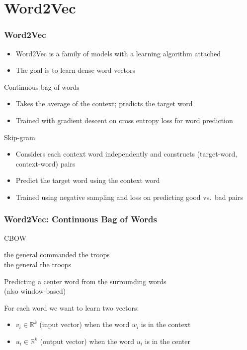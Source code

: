 \section{Word2Vec}
\frame{\tableofcontents[currentsection]}

\begin{frame}
\frametitle{Word2Vec}
\begin{itemize}[<+->]
	\item Word2Vec is a family of models with a learning algorithm attached
	\item The goal is to learn dense word vectors
\end{itemize}
\pause
\begin{alertblock}{Continuous bag of words}
	\begin{itemize}[<+->]
		\item Takes the average of the context; predicts the target word
		\item Trained with gradient descent on cross entropy loss for word prediction 
	\end{itemize}
\end{alertblock}
\pause
\begin{alertblock}{Skip-gram}
	\begin{itemize}[<+->]
		\item Considers each context word independently and constructs (target-word, context-word) pairs
		\item Predict the target word using the context word
		\item Trained using negative sampling and loss on predicting good vs.\ bad pairs
	\end{itemize}
\end{alertblock}
\end{frame}

\begin{frame}
\frametitle{Word2Vec: Continuous Bag of Words}
\begin{alertblock}{CBOW}
\begin{tabbing}
the \= general \= commanded \= the \= troops\kill \\
the \> general \> \rlap{\underline{\hphantom{commanded}}} \> the \> troops
\end{tabbing}
Predicting a center word from the surrounding words \\
(also window-based)
\end{alertblock}
\pause 
\begin{block}{For each word we want to learn two vectors:}
\begin{itemize}
	\item $v_i \in \mathbb{R}^k$ (input vector) when the word $w_i$ is in the context
	\item $u_i \in \mathbb{R}^k$ (output vector) when the word $u_i$ is in the center 
\end{itemize}
\end{block}
\end{frame}

